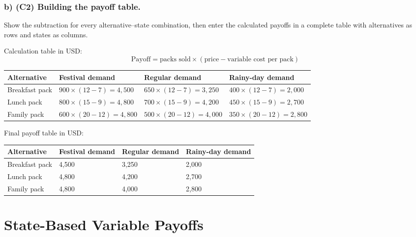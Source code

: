 \subsubsection*{b) \textbf{(C2)} Building the payoff table.}
\label{subsec:problem4-community-bakery-packs-c2}
Show the subtraction for every alternative--state combination, then enter the calculated payoffs in a complete table with alternatives as rows and states as columns.

Calculation table in USD:
\[
\text{Payoff}=\text{packs sold}\times(\text{price}-\text{variable cost per pack})
\]
\begin{center}
\small
\begin{tabular}{llll}
\toprule
Alternative & Festival demand & Regular demand & Rainy-day demand \\
\midrule
Breakfast pack & $900 \times (12 - 7) = 4{,}500$ & $650 \times (12 - 7) = 3{,}250$ & $400 \times (12 - 7) = 2{,}000$ \\
Lunch pack & $800 \times (15 - 9) = 4{,}800$ & $700 \times (15 - 9) = 4{,}200$ & $450 \times (15 - 9) = 2{,}700$ \\
Family pack & $600 \times (20 - 12) = 4{,}800$ & $500 \times (20 - 12) = 4{,}000$ & $350 \times (20 - 12) = 2{,}800$ \\
\bottomrule
\end{tabular}
\end{center}

Final payoff table in USD:
\begin{center}
\begin{tabular}{llll}
\toprule
Alternative & Festival demand & Regular demand & Rainy-day demand \\
\midrule
Breakfast pack & 4{,}500 & 3{,}250 & 2{,}000 \\
Lunch pack & 4{,}800 & 4{,}200 & 2{,}700 \\
Family pack & 4{,}800 & 4{,}000 & 2{,}800 \\
\bottomrule
\end{tabular}
\end{center}
\section{State-Based Variable Payoffs}
\label{sec:state-based-variable-payoffs}
